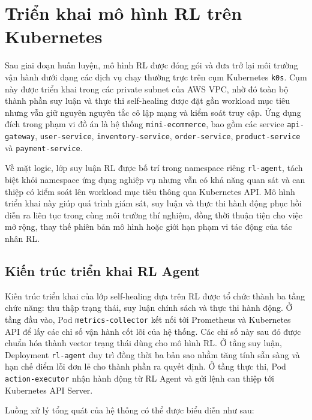 \section{Triển khai mô hình RL trên Kubernetes}

Sau giai đoạn huấn luyện, mô hình RL được đóng gói và đưa trở lại môi trường vận hành dưới dạng các dịch vụ chạy thường trực trên cụm Kubernetes \texttt{k0s}. Cụm này được triển khai trong các private subnet của AWS VPC, nhờ đó toàn bộ thành phần suy luận và thực thi self-healing được đặt gần workload mục tiêu nhưng vẫn giữ nguyên nguyên tắc cô lập mạng và kiểm soát truy cập. Ứng dụng đích trong phạm vi đồ án là hệ thống \texttt{mini-ecommerce}, bao gồm các service \texttt{api-gateway}, \texttt{user-service}, \texttt{inventory-service}, \texttt{order-service}, \texttt{product-service} và \texttt{payment-service}.

Về mặt logic, lớp suy luận RL được bố trí trong namespace riêng \texttt{rl-agent}, tách biệt khỏi namespace ứng dụng nghiệp vụ nhưng vẫn có khả năng quan sát và can thiệp có kiểm soát lên workload mục tiêu thông qua Kubernetes API. Mô hình triển khai này giúp quá trình giám sát, suy luận và thực thi hành động phục hồi diễn ra liên tục trong cùng môi trường thí nghiệm, đồng thời thuận tiện cho việc mở rộng, thay thế phiên bản mô hình hoặc giới hạn phạm vi tác động của tác nhân RL.

\subsection{Kiến trúc triển khai RL Agent}

Kiến trúc triển khai của lớp self-healing dựa trên RL được tổ chức thành ba tầng chức năng: thu thập trạng thái, suy luận chính sách và thực thi hành động. Ở tầng đầu vào, Pod \texttt{metrics-collector} kết nối tới Prometheus và Kubernetes API để lấy các chỉ số vận hành cốt lõi của hệ thống. Các chỉ số này sau đó được chuẩn hóa thành vector trạng thái dùng cho mô hình RL. Ở tầng suy luận, Deployment \texttt{rl-agent} duy trì đồng thời ba bản sao nhằm tăng tính sẵn sàng và hạn chế điểm lỗi đơn lẻ cho thành phần ra quyết định. Ở tầng thực thi, Pod \texttt{action-executor} nhận hành động từ RL Agent và gửi lệnh can thiệp tới Kubernetes API Server.

\noindent Luồng xử lý tổng quát của hệ thống có thể được biểu diễn như sau:

